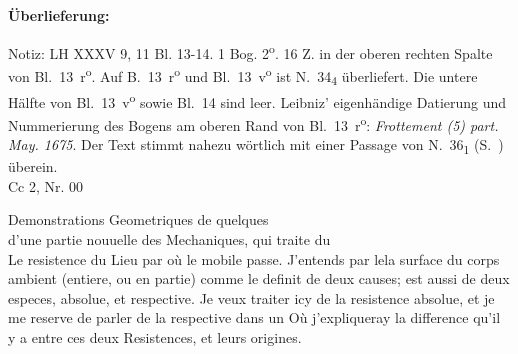 \begin{ledgroupsized}[r]{120mm}
\footnotesize 
\pstart                
\noindent\textbf{\"{U}berlieferung:}   
\pend
\end{ledgroupsized}
%           
\begin{ledgroupsized}[r]{114mm}
\footnotesize 
\pstart
\parindent -6mm
Notiz:
LH XXXV 9, 11 Bl. 13-14.
1 Bog. 2\textsuperscript{o}.
16 Z. in der oberen rechten Spalte von Bl.~13~r\textsuperscript{o}.
Auf B.~13~r\textsuperscript{o} und Bl.~13~v\textsuperscript{o} ist N.~34\textsubscript{4} überliefert.
Die untere H\"{a}lfte von Bl.~13~v\textsuperscript{o} sowie Bl.~14 sind leer.
Leibniz' eigenh\"{a}ndige Datierung und Nummerierung des Bogens am oberen Rand von Bl.~13~r\textsuperscript{o}:
\textit{Frottement (5) part. May. 1675}.
Der Text stimmt nahezu w\"{o}rtlich mit einer Passage von N.~36\textsubscript{1} (S.~) überein.%
\\Cc 2, Nr. 00
\pend
\end{ledgroupsized}
\vspace*{8mm}
\pstart
\noindent
[13~r\textsuperscript{o}]
\pend
\pstart 
\normalsize
%
\centering%
Demonstrations Geometriques de quelques
\\
d'une partie nouuelle des Mechaniques,
qui traite
du\\
\pend
\vspace*{0,5em} 
\pstart
\noindent
Le
resistence du Lieu par o\`{u} le mobile passe.
\pend
\pstart
J'entends par lela surface du corps ambient (entiere, ou en partie) comme le definit
de deux causes;
est aussi de deux especes, absolue, et respective.
Je veux traiter icy de la resistence absolue,
et je me reserve de parler de la respective dans un 
O\`{u} j'expliqueray la difference qu'il y a entre ces deux Resistences, et leurs origines.
\pend